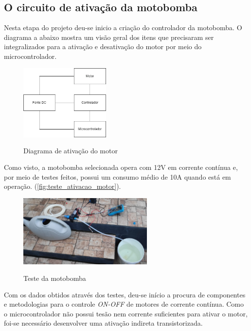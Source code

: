 \subsection{O circuito de ativação da motobomba}

Nesta etapa do projeto deu-se inicio a criação do controlador da motobomba. O diagrama a abaixo mostra um visão geral dos itens que precisaram ser integralizados para a ativação e desativação do motor por meio do microcontrolador.

 \begin{figure}[H]
	\centering
	\caption{Diagrama de ativação do motor}
	\includegraphics[width=0.4\textwidth]{figuras/ativacao_motor.png}
	\label{fig:diagrama_ativacao_motor}
\end{figure}


 Como visto, a motobomba selecionada opera com 12V em corrente contínua e, por meio de testes feitos, possui um consumo médio de 10A quando está em operação. (\autoref{fig:teste_ativacao_motor}).
 
  \begin{figure}[H]
 	\centering
 	\caption{Teste da motobomba}
 	\includegraphics[width=0.6\textwidth]{figuras/teste_motor.jpg}
 	\label{fig:teste_ativacao_motor}
 \end{figure}

Com os dados obtidos através dos testes, deu-se início a procura de componentes e metodologias para o controle \textit{ON-OFF} de motores de corrente contínua. Como o microcontrolador não possui tesão nem corrente suficientes para ativar o motor, foi-se necessário desenvolver uma ativação indireta transistorizada.  

